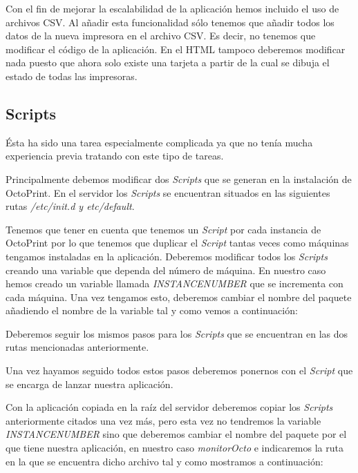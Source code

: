 Con el fin de mejorar la escalabilidad de la aplicación hemos incluido el uso de archivos CSV. Al añadir esta funcionalidad sólo tenemos que añadir todos los datos de la nueva impresora en el archivo CSV. Es decir, no tenemos que modificar el código de la aplicación. En el HTML tampoco deberemos modificar nada puesto que ahora solo existe una tarjeta a partir de la cual se dibuja el estado de todas las impresoras.

\subsection{Scripts}

Ésta ha sido una tarea especialmente complicada ya que no tenía mucha experiencia previa tratando con este tipo de tareas.

Principalmente debemos modificar dos \textit{Scripts}  que se generan en la instalación de OctoPrint. En el servidor los \textit{Scripts} se encuentran situados en las siguientes rutas \textit{/etc/init.d y etc/default}.

Tenemos que tener en cuenta que tenemos un \textit{Script} por cada instancia de OctoPrint por lo que tenemos que duplicar el \textit{Script} tantas veces como máquinas tengamos instaladas en la aplicación. Deberemos modificar todos los \textit{Scripts} creando una variable que dependa del número de máquina. En nuestro caso hemos creado un variable llamada \textit{INSTANCENUMBER} que se incrementa con cada máquina. Una vez tengamos esto, deberemos cambiar el nombre del paquete añadiendo el nombre de la variable tal y como vemos a continuación:


Deberemos seguir los mismos pasos para los \textit{Scripts} que se encuentran en las dos rutas mencionadas anteriormente.

Una vez hayamos seguido todos estos pasos deberemos ponernos con el \textit{Script} que se encarga de lanzar nuestra aplicación.

Con la aplicación copiada en la raíz del servidor deberemos copiar los \textit{Scripts} anteriormente citados una vez más, pero esta vez no tendremos la variable \textit{INSTANCENUMBER} sino que deberemos cambiar el nombre del paquete por el que tiene nuestra aplicación, en nuestro caso \textit{monitorOcto} e indicaremos la ruta en la que se encuentra dicho archivo tal y como mostramos a continuación:



